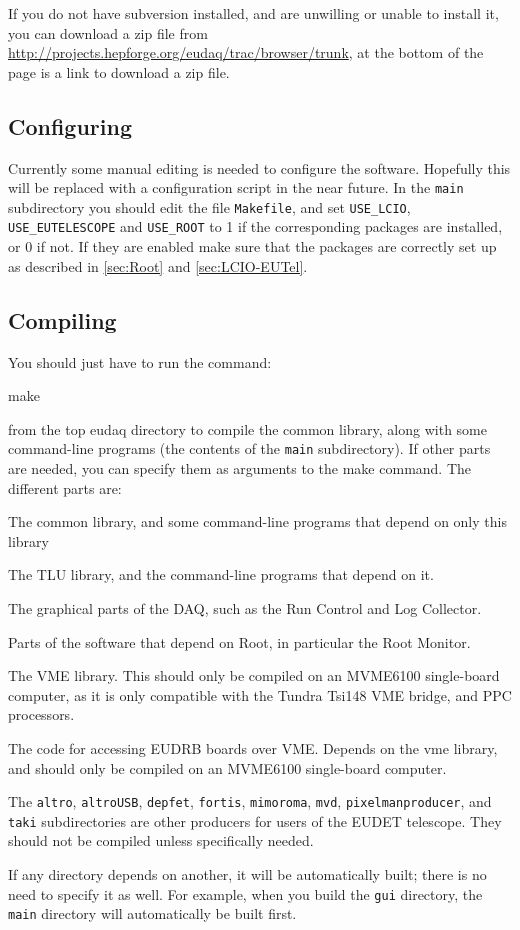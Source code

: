 If you do not have subversion installed, and are unwilling or unable to install it, you can download a zip file from
\url{http://projects.hepforge.org/eudaq/trac/browser/trunk}, at the bottom of the page is a link to download a zip file.

\subsection{Configuring}
Currently some manual editing is needed to configure the software.
Hopefully this will be replaced with a configuration script in the near future.
In the \texttt{main} subdirectory you should edit the file \texttt{Makefile},
and set \texttt{USE\_LCIO}, \texttt{USE\_EUTELESCOPE} and \texttt{USE\_ROOT}
to 1 if the corresponding packages are installed, or 0 if not.
If they are enabled make sure that the packages are correctly set up
as described in \autoref{sec:Root} and \autoref{sec:LCIO-EUTel}.

\subsection{Compiling}
You should just have to run the command:
\begin{listing}[mybash]
make
\end{listing}

from the top eudaq directory to compile the common library,
along with some command-line programs (the contents of the \texttt{main} subdirectory).
If other parts are needed, you can specify them as arguments to the make command.
The different parts are:
\begin{description}

The common library, and some command-line programs that depend on only this library

The TLU library, and the command-line programs that depend on it.

The graphical parts of the DAQ, such as the Run Control and Log Collector.

Parts of the software that depend on Root, in particular the Root Monitor.

The VME library. This should only be compiled on an MVME6100 single-board computer,
as it is only compatible with the Tundra Tsi148 VME bridge, and PPC processors. 

The code for accessing EUDRB boards over VME.
Depends on the vme library, and should only be compiled on an MVME6100 single-board computer.

\end{description}

The \texttt{altro}, \texttt{altroUSB}, \texttt{depfet}, \texttt{fortis}, \texttt{mimoroma}, \texttt{mvd}, \texttt{pixelmanproducer},
and \texttt{taki} subdirectories are other producers for users of the EUDET telescope.
They should not be compiled unless specifically needed.

If any directory depends on another, it will be automatically built; there is no need to specify it as well.
For example, when you build the \texttt{gui} directory, the \texttt{main} directory will automatically be built first.
